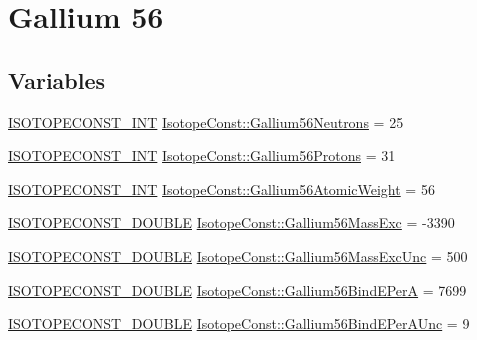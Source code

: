 \hypertarget{group___isotope_const-_gallium-_ga56}{}\section{Gallium 56}
\label{group___isotope_const-_gallium-_ga56}
\subsection*{Variables}
\begin{DoxyCompactItemize}
\item 
\mbox{\hyperlink{group___isotope_const-_macros_ga5f18360b3e99483a35c32d789e62621c}{I\+S\+O\+T\+O\+P\+E\+C\+O\+N\+S\+T\+\_\+\+I\+NT}} \mbox{\hyperlink{group___isotope_const-_gallium-_ga56_gaff304c9da2047a9d14482d515ba63533}{Isotope\+Const\+::\+Gallium56\+Neutrons}} = 25
\item 
\mbox{\hyperlink{group___isotope_const-_macros_ga5f18360b3e99483a35c32d789e62621c}{I\+S\+O\+T\+O\+P\+E\+C\+O\+N\+S\+T\+\_\+\+I\+NT}} \mbox{\hyperlink{group___isotope_const-_gallium-_ga56_ga5f3bf03104609129032abf87c1710e18}{Isotope\+Const\+::\+Gallium56\+Protons}} = 31
\item 
\mbox{\hyperlink{group___isotope_const-_macros_ga5f18360b3e99483a35c32d789e62621c}{I\+S\+O\+T\+O\+P\+E\+C\+O\+N\+S\+T\+\_\+\+I\+NT}} \mbox{\hyperlink{group___isotope_const-_gallium-_ga56_gab49a0b8ef2989fde388fdff800d0d6bb}{Isotope\+Const\+::\+Gallium56\+Atomic\+Weight}} = 56
\item 
\mbox{\hyperlink{group___isotope_const-_macros_ga8f45a7272ce02c0b4c65c44636ed719a}{I\+S\+O\+T\+O\+P\+E\+C\+O\+N\+S\+T\+\_\+\+D\+O\+U\+B\+LE}} \mbox{\hyperlink{group___isotope_const-_gallium-_ga56_gab4e7313f6495910194301fc757dcfdf9}{Isotope\+Const\+::\+Gallium56\+Mass\+Exc}} = -\/3390
\item 
\mbox{\hyperlink{group___isotope_const-_macros_ga8f45a7272ce02c0b4c65c44636ed719a}{I\+S\+O\+T\+O\+P\+E\+C\+O\+N\+S\+T\+\_\+\+D\+O\+U\+B\+LE}} \mbox{\hyperlink{group___isotope_const-_gallium-_ga56_ga1157c6c82081a12c100e1f26c1e2c0c2}{Isotope\+Const\+::\+Gallium56\+Mass\+Exc\+Unc}} = 500
\item 
\mbox{\hyperlink{group___isotope_const-_macros_ga8f45a7272ce02c0b4c65c44636ed719a}{I\+S\+O\+T\+O\+P\+E\+C\+O\+N\+S\+T\+\_\+\+D\+O\+U\+B\+LE}} \mbox{\hyperlink{group___isotope_const-_gallium-_ga56_ga309b310f785fc404b6fbb97ecaeecfcf}{Isotope\+Const\+::\+Gallium56\+Bind\+E\+PerA}} = 7699
\item 
\mbox{\hyperlink{group___isotope_const-_macros_ga8f45a7272ce02c0b4c65c44636ed719a}{I\+S\+O\+T\+O\+P\+E\+C\+O\+N\+S\+T\+\_\+\+D\+O\+U\+B\+LE}} \mbox{\hyperlink{group___isotope_const-_gallium-_ga56_ga9336bff73a4f97bf0363f257d8d7d11f}{Isotope\+Const\+::\+Gallium56\+Bind\+E\+Per\+A\+Unc}} = 9

\end{DoxyCompactItemize}
